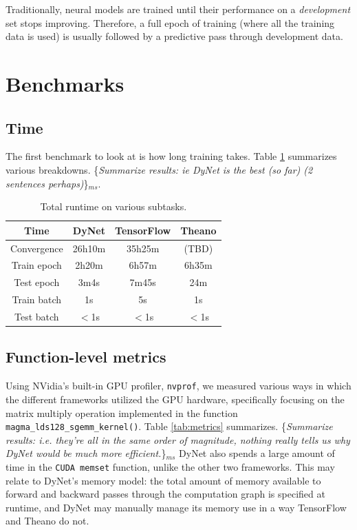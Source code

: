 \documentclass{article}
\newcommand{\ms}[1]{{\color{cyan}\{\textit{#1}\}$_{ms}$}}
\begin{document}
Traditionally, neural models are trained until their performance on a \textit{development} set stops improving. Therefore, a full epoch of training (where all the training data is used) is usually followed by a predictive pass through development data.
\section{Benchmarks}
\subsection{Time}
The first benchmark to look at is how long training takes. Table \ref{tab:timing} summarizes various breakdowns. \ms{Summarize results: ie DyNet is the best (so far) (2 sentences perhaps)}.
\begin{table}
\begin{tabular}{c|ccc}
Time					& DyNet 		& TensorFlow 	& Theano \\ \hline
Convergence		& 26h10m 		& 35h25m 			& (TBD)\\
Train epoch 		& 2h20m		& 6h57m 			& 6h35m \\
Test epoch 		& 3m4s			& 7m45s 			& 24m \\
Train batch 		& 1s 				& 5s 					& 1s \\
Test batch 			& $<$1s 		& $<$1s 			& $<$1s \\
\end{tabular}
\caption{\label{tab:timing}Total runtime on various subtasks.}
\end{table}
\subsection{Function-level metrics}
Using NVidia's built-in GPU profiler, \verb!nvprof!, we measured various ways in which the different frameworks utilized the GPU hardware, specifically focusing on the matrix multiply operation implemented in the function \verb!magma_lds128_sgemm_kernel()!. Table \ref{tab:metrics} summarizes. \ms{Summarize results: i.e. they're all in the same order of magnitude, nothing really tells us why DyNet would be much more efficient.} DyNet also spends a large amount of time in the \texttt{CUDA memset} function, unlike the other two frameworks. This may relate to DyNet's memory model: the total amount of memory available to forward and backward passes through the computation graph is specified at runtime, and DyNet may manually manage its memory use in a way TensorFlow and Theano do not.
\end{document}
